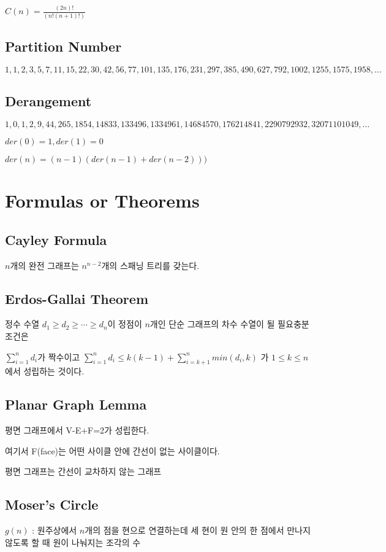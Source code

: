 \documentclass[landscape, 8pt, a4paper, oneside, twocolumn]{extarticle}
\begin{document}
$C(n) = \frac{(2n)!}{(n!(n+1)!)}$

\subsection{Partition Number}
$1, 1, 2, 3, 5, 7, 11, 15, 22, 30, 42, 56, 77, 101, 135, 176, 231, 297, 385, 490, 627, 792, 1002, 1255, 1575, 1958, \dots$

\subsection{Derangement}
$1, 0, 1, 2, 9, 44, 265, 1854, 14833, 133496, 1334961, 14684570, 176214841, 2290792932, 32071101049, \dots$

$der(0) = 1, der(1) = 0$

$der(n) = (n-1)(der(n-1)+der(n-2)))$
\section{Formulas or Theorems}
\subsection{Cayley Formula}
$n$개의 완전 그래프는 $n^{n-2}$개의 스패닝 트리를 갖는다.

\subsection{Erdos-Gallai Theorem}
정수 수열 $d_1 \ge d_2 \ge \cdots \ge d_n$이 정점이 $n$개인 단순 그래프의 차수 수열이 될 필요충분조건은

$\sum_{i=1}^{n}d_i$가 짝수이고 $\sum_{i=1}^{n}d_i \le k(k-1)+\sum_{i=k+1}^{n}min(d_i, k)$ 가 $1\le k \le n$에서 성립하는 것이다.

\subsection{Planar Graph Lemma}
평면 그래프에서 V-E+F=2가 성립한다.

여기서 F(face)는 어떤 사이클 안에 간선이 없는 사이클이다.

평면 그래프는 간선이 교차하지 않는 그래프
\subsection{Moser's Circle}
$g(n)$ : 원주상에서 $n$개의 점을 현으로 연결하는데 세 현이 원 안의 한 점에서 만나지 않도록 할 때 원이 나눠지는 조각의 수
\end{document}
